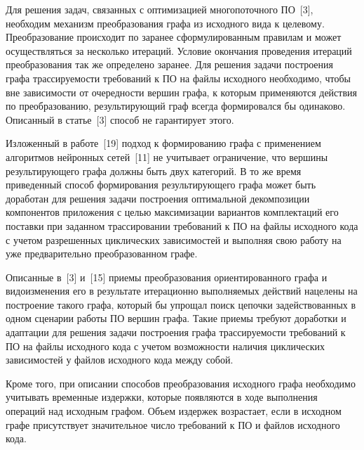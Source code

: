 Для решения задач, связанных с оптимизацией многопоточного ПО~[3], необходим механизм преобразования графа из исходного вида к целевому. Преобразование происходит по заранее сформулированным правилам и может осуществляться за несколько итераций. Условие окончания проведения итераций преобразования так же определено заранее. Для решения задачи построения графа трассируемости требований к ПО на файлы исходного необходимо, чтобы вне зависимости от очередности вершин графа, к которым применяются действия по преобразованию, результирующий граф всегда формировался бы одинаково. Описанный в статье~[3] способ не гарантирует этого. 

Изложенный в работе~[19] подход к формированию графа с применением алгоритмов нейронных сетей~[11] не учитывает ограничение, что вершины результирующего графа должны быть двух категорий. В то же время приведенный способ формирования результирующего графа может быть доработан для решения задачи построения оптимальной декомпозиции компонентов приложения с целью максимизации вариантов комплектаций его поставки при заданном трассировании требований к ПО на файлы исходного кода с учетом разрешенных циклических зависимостей и выполняя свою работу на уже предварительно преобразованном графе.

Описанные в~[3] и~[15] приемы преобразования ориентированного графа и видоизменения его в результате итерационно выполняемых действий нацелены на построение такого графа, который бы упрощал поиск цепочки задействованных в одном сценарии работы ПО вершин графа. Такие приемы требуют доработки и адаптации для решения задачи построения графа трассируемости требований к ПО на файлы исходного кода с учетом возможности наличия циклических зависимостей у файлов исходного кода между собой.

Кроме того, при описании способов преобразования исходного графа необходимо учитывать временные издержки, которые появляются в ходе выполнения операций над исходным графом. Объем издержек возрастает, если в исходном графе присутствует значительное число требований к ПО и файлов исходного кода.
